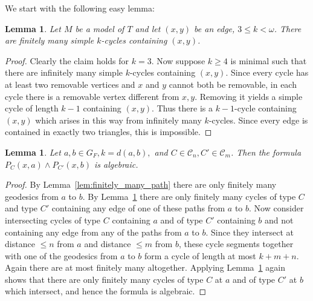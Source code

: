 \documentclass[10pt,a4paper]{amsart}
\newcommand{\C}{\mathcal{C}}
\newtheorem{lemma}[defi]{Lemma}
\begin{document}
We start with the following easy lemma:

\begin{lemma}\label{lem:finitely many cycles}
Let $M$ be a model of $T$ and let $(x,y)$ be an edge, $3\leq k<\omega$. There are finitely many simple $k$-cycles  containing $(x,y)$.
\end{lemma}
\begin{proof}
Clearly the claim holds for $k=3$.
Now suppose $k\geq 4$ is minimal such that there are infinitely many simple $k$-cycles  containing $(x,y)$. Since every cycle has at least two removable vertices and $x$ and $y$ cannot both be removable, in each cycle there is a removable vertex different from $x, y$. Removing it yields a simple cycle of length $k-1$ containing $(x,y)$. Thus there is a $k-1$-cycle containing $(x,y)$ which arises in this way from infinitely many $k$-cycles. Since every edge is contained in exactly two triangles, this is impossible.
\end{proof}

\begin{lemma}\label{lem:str min}
Let $a,b\in G_F, k=d(a,b),$ and $C\in \C_n, C'\in\C_m$. Then the formula $P_C(x,a)\wedge P_{C'}(x,b)$ is algebraic.
\end{lemma}
\begin{proof}
By Lemma~\ref{lem:finitely_many_path} there are only finitely many geodesics from $a$ to $b$. By Lemma~\ref{lem:finitely many cycles} there are only finitely many cycles of type $C$ and type $C'$ containing any edge of one of these paths from $a$ to $b$. Now consider intersecting cycles of type $C$ containing $a$ and of type $C'$ containing $b$ and not containing any edge from any of the paths from $a$ to $b$. Since they intersect at distance $\leq n$ from $a$ and distance $\leq m$ from $b$, these cycle segments together with one of the geodesics from $a$ to $b$ form a cycle of length at most $k+m+n$. Again there are at most finitely many altogether. Applying Lemma~\ref{lem:finitely many cycles} again shows that there are only finitely many cycles of type $C$ at $a$ and of type $C'$ at $b$ which intersect, and hence the formula is algebraic.

\end{proof}
\end{document}
